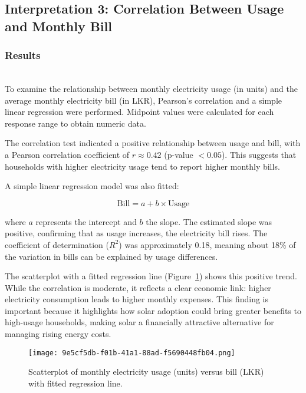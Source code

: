 \documentclass[12pt,a4paper]{article}
\begin{document}
\subsection{Interpretation 3: Correlation Between Usage and Monthly Bill}

\subsubsection*{Results} \\

To examine the relationship between monthly electricity usage (in units) and the 
average monthly electricity bill (in LKR), Pearson’s correlation and a simple linear 
regression were performed. Midpoint values were calculated for each response 
range to obtain numeric data.

The correlation test indicated a positive relationship between usage and bill, 
with a Pearson correlation coefficient of $r \approx 0.42$ (p-value $< 0.05$). 
This suggests that households with higher electricity usage tend to report 
higher monthly bills.

A simple linear regression model was also fitted:

\[
\text{Bill} = a + b \times \text{Usage}
\]

where $a$ represents the intercept and $b$ the slope. The estimated slope was 
positive, confirming that as usage increases, the electricity bill rises. The 
coefficient of determination ($R^2$) was approximately 0.18, meaning about 18\% 
of the variation in bills can be explained by usage differences.


The scatterplot with a fitted regression line (Figure~\ref{fig:usage_vs_bill}) 
shows this positive trend. While the correlation is moderate, it reflects a clear 
economic link: higher electricity consumption leads to higher monthly expenses. 
This finding is important because it highlights how solar adoption could bring 
greater benefits to high-usage households, making solar a financially attractive 
alternative for managing rising energy costs.

\begin{figure}[h]
    \centering
    \texttt{[image: 9e5cf5db-f01b-41a1-88ad-f5690448fb04.png]}
    \caption{Scatterplot of monthly electricity usage (units) versus bill (LKR) with fitted regression line.}
    \label{fig:usage_vs_bill}
\end{figure}
\end{document}

